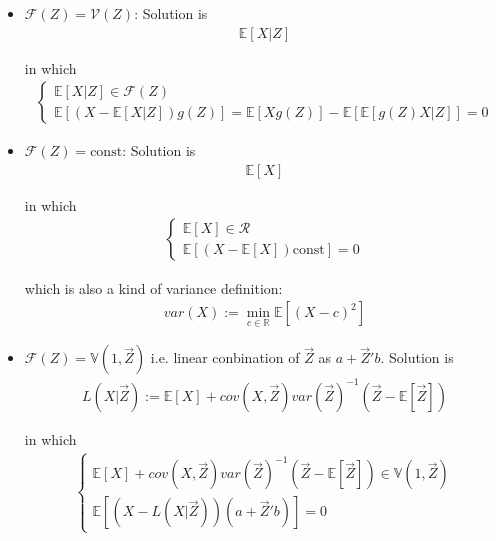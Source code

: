 \begin{itemize}[topsep=2pt,itemsep=0pt]
    \item $ \mathscr{F}(Z)=\mathscr{V}(Z) $: Solution is 
    \begin{align*}
        \mathbb{E}\left[ X|Z \right] 
    \end{align*}
    
    in which
    \begin{align*}
        \begin{cases}
            \mathbb{E}\left[ X|Z \right] \in\mathscr{F}(Z)\\
            \mathbb{E}\left[(X-\mathbb{E}\left[ X|Z \right] )g(Z) \right]=\mathbb{E}\left[ Xg(Z) \right] -\mathbb{E}\left[ \mathbb{E}\left[ g(Z)X|Z \right]  \right] =0 
        \end{cases} 
    \end{align*}
    \item $ \mathscr{F}(Z)=\mathrm{const} $: Solution is
    \begin{align*}
         \mathbb{E}\left[ X \right]  
    \end{align*}
    
    in which
    \begin{align*}
        \begin{cases}
            \mathbb{E}\left[ X \right]\in \mathcal{R}\\
            \mathbb{E}\left[ (X-\mathbb{E}\left[ X \right] )\mathrm{const} \right]=0 
        \end{cases} 
    \end{align*}

    which is also a kind of variance definition:
    \begin{align*}
        var(X):=\min_{c\in\mathbb{R}}\mathbb{E}\left[ (X-c)^2 \right]  
    \end{align*}
    
    \item \hypertarget{MMSELinear}{}$ \mathscr{F}(Z)=\mathbb{V}(1,\vec{Z}) $ i.e. linear conbination of $ \vec{Z} $ as $ a+\vec{Z}'b $. Solution is
    \begin{align*}
        L(X|\vec{Z}):=\mathbb{E}\left[ X \right] +cov(X,\vec{Z})var(\vec{Z})^{-1}\left(\vec{Z}-\mathbb{E}\left[ \vec{Z} \right] \right)
    \end{align*}
    
    in which
    \begin{align*}
        \begin{cases}
            \mathbb{E}\left[ X \right] +cov(X,\vec{Z})var(\vec{Z})^{-1}\left(\vec{Z}-\mathbb{E}\left[ \vec{Z} \right] \right)\in \mathbb{V}(1,\vec{Z})\\
        \mathbb{E}\left[ (X-L(X|\vec{Z}))(a+\vec{Z}'b) \right] = 0
        \end{cases}
    \end{align*}
    
\end{itemize}


